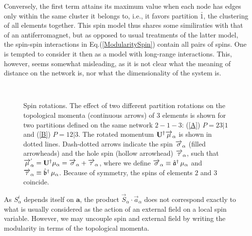 \documentclass[twocolumn,aps,sort,nofootinbib]{revtex4}
\begin{document}
Conversely, the first term attains its maximum value when each node has edges only
within the same cluster it belongs to, i.e., it favors partition $\bar{1}$, the clustering
of all elements together. 
This spin model thus shares some similiraties with that of an antiferromagnet, 
but as opposed to usual treatments of the latter model, 
the spin-spin interactions in Eq.(\ref{ModularitySpin})
contain all pairs of spins. One is tempted to consider it then as a model 
with long-range interactions. This, however, seems somewhat misleading, as it
is not clear what the meaning of distance on the network is, nor what the
dimensionality of the system is. 

\begin{figure}
\\
\caption{%
Spin rotations. The effect of two different partition rotations on the topological
momenta (continuous arrows) of $3$ elements is shown for two partitions defined
on the same network $2-1-3$: (\ref{A}) $P=23|1$
and (\ref{B}) $P=12|3$. The rotated 
momentum $\mathbf{U}^\dagger\protect\overrightarrow{\mu}_\alpha$ is shown in dotted lines.
Dash-dotted arrows indicate the spin $\protect\overrightarrow{\sigma}_\alpha$ (filled arrowheads)
and the hole spin (hollow arrowhead) $\protect\overrightarrow{\tau}_\alpha$, such that 
$\protect\overrightarrow{\mu}^{'}_\alpha=
\mathbf{U}^\dagger\mu_\alpha=\protect\overrightarrow{\sigma}_\alpha+\protect\overrightarrow{\tau}_\alpha$,
where we define $\protect\overrightarrow{\sigma}_\alpha\equiv\mathfrak{\hat{a}}^\dagger\,\mu_\alpha$ 
and $\protect\overrightarrow{\tau}_\alpha\equiv\mathfrak{\hat{b}}^\dagger\,\mu_\alpha$.
Because of symmetry, the spins of elements $2$ and $3$ coincide.
}
\label{DispersionHoleSpin}
\end{figure}

As $S^i_\alpha$ depends itself on $\mathbf{a}$,
the product  
$\overrightarrow{S}_\alpha\cdot\overrightarrow{a}_\alpha$ 
does not correspond exactly to what
is usually considered as the action of an
external field on a local spin variable.
However, we may uncouple spin and external
field by writing the modularity in terms of
the topological momenta.
\end{document}
